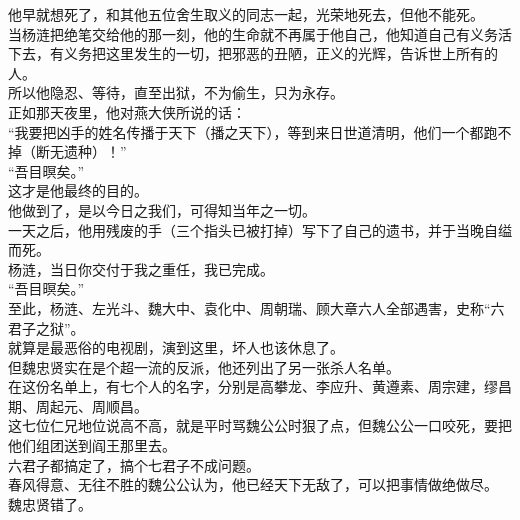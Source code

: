 \begin{multicols}{\theparacolNo}
他早就想死了，和其他五位舍生取义的同志一起，光荣地死去，但他不能死。\\

当杨涟把绝笔交给他的那一刻，他的生命就不再属于他自己，他知道自己有义务活下去，有义务把这里发生的一切，把邪恶的丑陋，正义的光辉，告诉世上所有的人。\\

所以他隐忍、等待，直至出狱，不为偷生，只为永存。\\

正如那天夜里，他对燕大侠所说的话：\\

“我要把凶手的姓名传播于天下（播之天下），等到来日世道清明，他们一个都跑不掉（断无遗种）！”\\

“吾目暝矣。”\\

这才是他最终的目的。\\

他做到了，是以今日之我们，可得知当年之一切。\\

一天之后，他用残废的手（三个指头已被打掉）写下了自己的遗书，并于当晚自缢而死。\\

杨涟，当日你交付于我之重任，我已完成。\\

“吾目暝矣。”\\

至此，杨涟、左光斗、魏大中、袁化中、周朝瑞、顾大章六人全部遇害，史称“六君子之狱”。\\

就算是最恶俗的电视剧，演到这里，坏人也该休息了。\\

但魏忠贤实在是个超一流的反派，他还列出了另一张杀人名单。\\

在这份名单上，有七个人的名字，分别是高攀龙、李应升、黄遵素、周宗建，缪昌期、周起元、周顺昌。\\

这七位仁兄地位说高不高，就是平时骂魏公公时狠了点，但魏公公一口咬死，要把他们组团送到阎王那里去。\\

六君子都搞定了，搞个七君子不成问题。\\

春风得意、无往不胜的魏公公认为，他已经天下无敌了，可以把事情做绝做尽。\\

魏忠贤错了。\\


\end{multicols}
